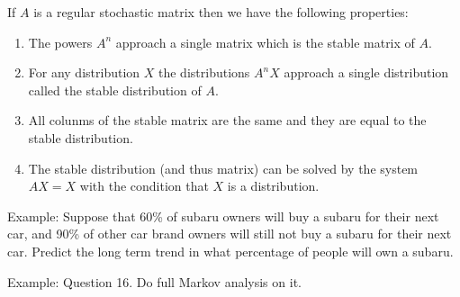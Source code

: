 \documentclass[14,fleqn]{article}
\begin{document}
If $A$ is a regular stochastic matrix then we have the following properties:
\begin{enumerate}
	\item The powers $A^n$ approach a single matrix which is the stable matrix of $A.$
	\item For any distribution $X$ the distributions $A^nX$ approach a single distribution called the stable distribution of $A.$
	\item All colunms of the stable matrix are the same and they are equal to the stable distribution.
	\item The stable distribution (and thus matrix) can be solved by the system $AX=X$ with the condition that $X$ is a distribution.
\end{enumerate}

Example: Suppose that 60\% of subaru owners will buy a subaru for their next car, and 90\% of other car brand owners will still not buy a subaru for their next car. Predict the long term trend in what percentage of people will own a subaru.

Example: Question 16. Do full Markov analysis on it.
\end{document}
